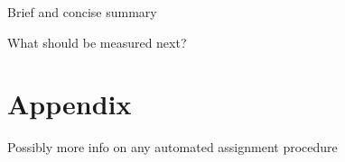 \documentclass[a4paper]{article}
\begin{document}
Brief and concise summary

What should be measured next?

\section{Appendix}
Possibly more info on any automated assignment procedure








\end{document}
